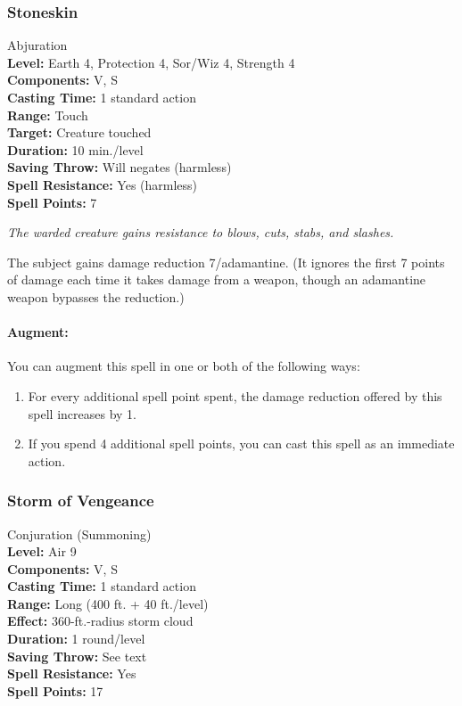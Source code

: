 \subsubsection{Stoneskin}
\label{Spell:Stoneskin}
Abjuration
\\ \textbf{Level:} Earth 4, Protection 4, Sor/Wiz 4, Strength 4
\\ \textbf{Components:} V, S
\\ \textbf{Casting Time:} 1 standard action
\\ \textbf{Range:} Touch
\\ \textbf{Target:} Creature touched
\\ \textbf{Duration:} 10 min./level 
\\ \textbf{Saving Throw:} Will negates (harmless)
\\ \textbf{Spell Resistance:} Yes (harmless)
\\ \textbf{Spell Points:} 7

\emph{The warded creature gains resistance to blows, cuts, stabs, and slashes. }

The subject gains damage reduction 7/adamantine. 
(It ignores the first 7 points of damage each time it takes damage from a weapon, though an adamantine weapon bypasses the reduction.)

\paragraph{Augment:} You can augment this spell in one or both of the following ways:
\begin{enumerate}
 \item For every additional spell point spent, the damage reduction offered by this spell increases by 1.
 \item If you spend 4 additional spell points, you can cast this spell as an immediate action.
\end{enumerate}
\subsubsection{Storm of Vengeance}
\label{Spell:StormOfVengeance}
Conjuration (Summoning)
\\ \textbf{Level:} Air 9
\\ \textbf{Components:} V, S
\\ \textbf{Casting Time:} 1 standard action
\\ \textbf{Range:} Long (400 ft. + 40 ft./level)
\\ \textbf{Effect:} 360-ft.-radius storm cloud
\\ \textbf{Duration:} 1 round/level
\\ \textbf{Saving Throw:} See text
\\ \textbf{Spell Resistance:} Yes
\\ \textbf{Spell Points:} 17

